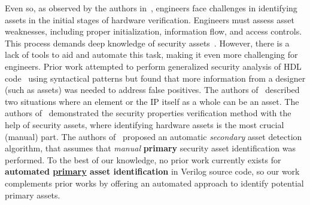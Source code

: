 Even so, as observed by the authors in~\cite{10140100}, engineers face challenges in identifying assets in the initial stages of hardware verification. 
Engineers must assess asset weaknesses, including proper initialization, information flow, and access controls. This process demands deep knowledge of security assets~\cite{ray_system--chip_2018}. However, there is a lack of tools to aid and automate this task, making it even more challenging for engineers.
Prior work attempted to perform generalized security analysis of \ac{HDL} code~\cite{Ahmad_2022} using syntactical patterns but found that more information from a designer (such as assets) was needed to address false positives. 
The authors of~\cite{polian_introduction_2017} described two situations where an element or the \ac{IP} itself as a whole can be an asset.
The authors of~\cite{meza_security_2023} demonstrated the security properties verification method with the help of security assets, where identifying hardware assets is the most crucial (manual) part. 
The authors of~\cite{farzana_saif_2021, Ayalasomayajula_Automatic_2024} proposed an automatic \textit{secondary} asset detection algorithm, that assumes that \textit{manual} \textbf{primary} security asset identification was performed. 
To the best of our knowledge, no prior work currently exists for \textbf{automated \underline{primary} asset identification} in Verilog source code, so our work complements prior works by offering an automated approach to identify potential primary assets.